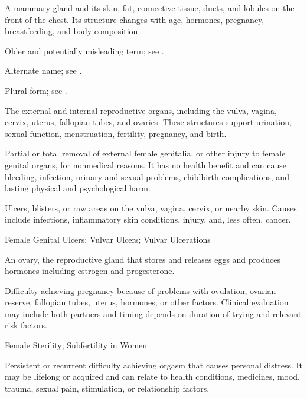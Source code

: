  A mammary gland and its skin, fat, connective tissue, ducts, and lobules on the front of the chest. Its structure changes with age, hormones, pregnancy, breastfeeding, and body composition.

 Older and potentially misleading term; see .

 Alternate name; see .

 Plural form; see .

 The external and internal reproductive organs, including the vulva, vagina, cervix, uterus, fallopian tubes, and ovaries. These structures support urination, sexual function, menstruation, fertility, pregnancy, and birth.

 Partial or total removal of external female genitalia, or other injury to female genital organs, for nonmedical reasons. It has no health benefit and can cause bleeding, infection, urinary and sexual problems, childbirth complications, and lasting physical and psychological harm.

 Ulcers, blisters, or raw areas on the vulva, vagina, cervix, or nearby skin. Causes include infections, inflammatory skin conditions, injury, and, less often, cancer.

\synonyms
Female Genital Ulcers; Vulvar Ulcers; Vulvar Ulcerations

 An ovary, the reproductive gland that stores and releases eggs and produces hormones including estrogen and progesterone.

 Difficulty achieving pregnancy because of problems with ovulation, ovarian reserve, fallopian tubes, uterus, hormones, or other factors. Clinical evaluation may include both partners and timing depends on duration of trying and relevant risk factors.


\synonyms
Female Sterility; Subfertility in Women

 Persistent or recurrent difficulty achieving orgasm that causes personal distress. It may be lifelong or acquired and can relate to health conditions, medicines, mood, trauma, sexual pain, stimulation, or relationship factors.

